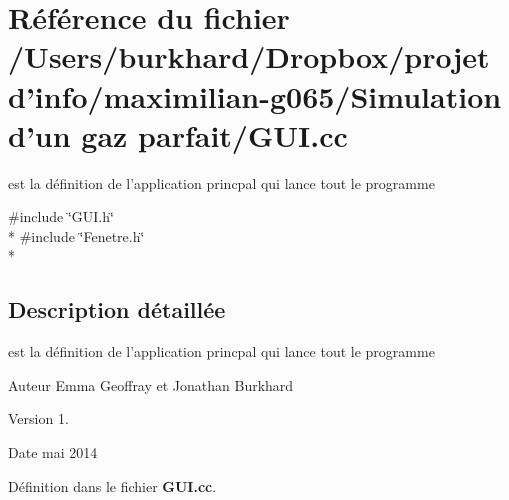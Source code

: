 \section{Référence du fichier /\+Users/burkhard/\+Dropbox/projet d'info/maximilian-\/g065/\+Simulation d'un gaz parfait/\+G\+U\+I.cc}
\label{_g_u_i_8cc}


est la définition de l'application princpal qui lance tout le programme  


{\ttfamily \#include \char`\"{}G\+U\+I.\+h\char`\"{}}\\*
{\ttfamily \#include \char`\"{}Fenetre.\+h\char`\"{}}\\*


\subsection{Description détaillée}
est la définition de l'application princpal qui lance tout le programme 

\begin{DoxyAuthor}{Auteur}
Emma Geoffray et Jonathan Burkhard 
\end{DoxyAuthor}
\begin{DoxyVersion}{Version}
1. 
\end{DoxyVersion}
\begin{DoxyDate}{Date}
mai 2014 
\end{DoxyDate}


Définition dans le fichier {\bf G\+U\+I.\+cc}.

